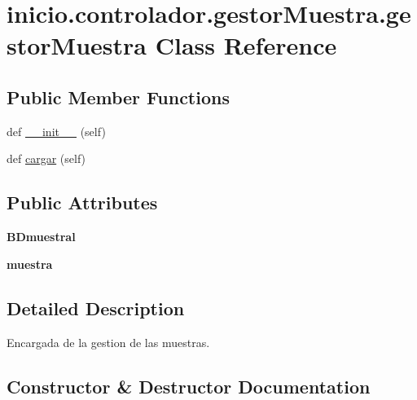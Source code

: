\hypertarget{classinicio_1_1controlador_1_1gestor_muestra_1_1gestor_muestra}{}\section{inicio.\+controlador.\+gestor\+Muestra.\+gestor\+Muestra Class Reference}
\label{classinicio_1_1controlador_1_1gestor_muestra_1_1gestor_muestra}
\subsection*{Public Member Functions}
\begin{DoxyCompactItemize}
\item 
def \hyperlink{classinicio_1_1controlador_1_1gestor_muestra_1_1gestor_muestra_ae6d836e3f70c1016f43056b6318fc64b}{\+\_\+\+\_\+init\+\_\+\+\_\+} (self)
\item 
def \hyperlink{classinicio_1_1controlador_1_1gestor_muestra_1_1gestor_muestra_a85e77a3e43a14f8eceb5d4891aac39a9}{cargar} (self)
\end{DoxyCompactItemize}
\subsection*{Public Attributes}
\begin{DoxyCompactItemize}
\item 
\mbox{\label{classinicio_1_1controlador_1_1gestor_muestra_1_1gestor_muestra_a41b7d88fb41236325863c5a878c127dc}} 
{\bfseries B\+Dmuestral}
\item 
\mbox{\label{classinicio_1_1controlador_1_1gestor_muestra_1_1gestor_muestra_ad2b5004842077da630c7554efcaee37e}} 
{\bfseries muestra}
\end{DoxyCompactItemize}


\subsection{Detailed Description}
\begin{DoxyVerb}Encargada de la gestion de las muestras.
\end{DoxyVerb}
 

\subsection{Constructor \& Destructor Documentation}
\mbox{\label{classinicio_1_1controlador_1_1gestor_muestra_1_1gestor_muestra_ae6d836e3f70c1016f43056b6318fc64b}} 
